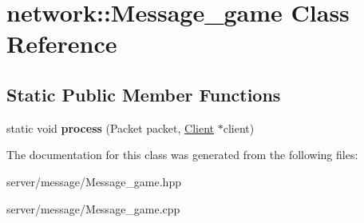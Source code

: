 \hypertarget{classnetwork_1_1_message__game}{\section{network\-:\-:Message\-\_\-game Class Reference}
\label{classnetwork_1_1_message__game}
}
\subsection*{Static Public Member Functions}
\begin{DoxyCompactItemize}
\item 
\hypertarget{classnetwork_1_1_message__game_ab1d07a668180c323f13d7e60c370e70f}{static void {\bfseries process} (Packet packet, \hyperlink{class_client}{Client} $\ast$client)}\label{classnetwork_1_1_message__game_ab1d07a668180c323f13d7e60c370e70f}

\end{DoxyCompactItemize}


The documentation for this class was generated from the following files\-:\begin{DoxyCompactItemize}
\item 
server/message/Message\-\_\-game.\-hpp\item 
server/message/Message\-\_\-game.\-cpp\end{DoxyCompactItemize}
